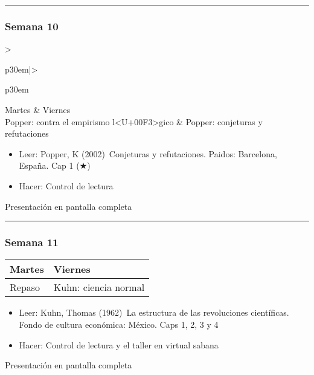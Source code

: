 \documentclass[spanish,]{article}
\begin{document}
\begin{center}\rule{0.5\linewidth}{\linethickness}\end{center}

\subsubsection{Semana 10}\label{semana-10}

\begin{tabular}{>{\raggedright\arraybackslash}p{30em}|>{\raggedright\arraybackslash}p{30em}}
\hline
Martes & Viernes\\
\hline
Popper: contra el empirismo l<U+00F3>gico & Popper: conjeturas y refutaciones\\
\hline
\end{tabular}

\begin{itemize}
\item
  Leer: Popper, K (2002)~Conjeturas y refutaciones. Paidos: Barcelona,
  España. Cap 1 (★)
\item
  Hacer: Control de lectura
\end{itemize}

Presentación en pantalla completa

\begin{center}\rule{0.5\linewidth}{\linethickness}\end{center}

\subsubsection{Semana 11}\label{semana-11}

\begin{tabular}{>{\raggedright\arraybackslash}p{30em}|>{\raggedright\arraybackslash}p{30em}}
\hline
Martes & Viernes\\
\hline
Repaso & Kuhn: ciencia normal\\
\hline
\end{tabular}

\begin{itemize}
\item
  Leer: Kuhn, Thomas (1962)~La estructura de las revoluciones
  científicas. Fondo de cultura económica: México. Caps 1, 2, 3 y 4
\item
  Hacer: Control de lectura y el taller en virtual sabana
\end{itemize}

Presentación en pantalla completa
\end{document}
